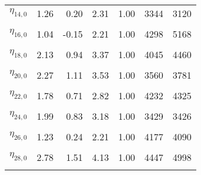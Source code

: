 \begin{table}
\begin{tabular}[t]{lrrrrrr}
$\eta_{14, 0}$ & 1.26 & 0.20 & 2.31 & 1.00 & 3344 & 3120\\
\cellcolor{gray!6}{$\eta_{15, 0}$} & \cellcolor{gray!6}{1.16} & \cellcolor{gray!6}{0.22} & \cellcolor{gray!6}{2.11} & \cellcolor{gray!6}{1.00} & \cellcolor{gray!6}{3137} & \cellcolor{gray!6}{1624}\\
$\eta_{16, 0}$ & 1.04 & -0.15 & 2.21 & 1.00 & 4298 & 5168\\
\cellcolor{gray!6}{$\eta_{17, 0}$} & \cellcolor{gray!6}{1.61} & \cellcolor{gray!6}{0.76} & \cellcolor{gray!6}{2.47} & \cellcolor{gray!6}{1.00} & \cellcolor{gray!6}{3896} & \cellcolor{gray!6}{3989}\\
$\eta_{18, 0}$ & 2.13 & 0.94 & 3.37 & 1.00 & 4045 & 4460\\
\cellcolor{gray!6}{$\eta_{19, 0}$} & \cellcolor{gray!6}{1.52} & \cellcolor{gray!6}{0.75} & \cellcolor{gray!6}{2.24} & \cellcolor{gray!6}{1.00} & \cellcolor{gray!6}{4252} & \cellcolor{gray!6}{4128}\\
$\eta_{20, 0}$ & 2.27 & 1.11 & 3.53 & 1.00 & 3560 & 3781\\
\cellcolor{gray!6}{$\eta_{21, 0}$} & \cellcolor{gray!6}{3.12} & \cellcolor{gray!6}{2.27} & \cellcolor{gray!6}{4.00} & \cellcolor{gray!6}{1.00} & \cellcolor{gray!6}{3923} & \cellcolor{gray!6}{3252}\\
$\eta_{22, 0}$ & 1.78 & 0.71 & 2.82 & 1.00 & 4232 & 4325\\
\cellcolor{gray!6}{$\eta_{23, 0}$} & \cellcolor{gray!6}{2.18} & \cellcolor{gray!6}{0.88} & \cellcolor{gray!6}{3.50} & \cellcolor{gray!6}{1.00} & \cellcolor{gray!6}{2298} & \cellcolor{gray!6}{1391}\\
$\eta_{24, 0}$ & 1.99 & 0.83 & 3.18 & 1.00 & 3429 & 3426\\
\cellcolor{gray!6}{$\eta_{25, 0}$} & \cellcolor{gray!6}{2.94} & \cellcolor{gray!6}{1.90} & \cellcolor{gray!6}{3.98} & \cellcolor{gray!6}{1.00} & \cellcolor{gray!6}{2949} & \cellcolor{gray!6}{2966}\\
$\eta_{26, 0}$ & 1.23 & 0.24 & 2.21 & 1.00 & 4177 & 4090\\
\cellcolor{gray!6}{$\eta_{27, 0}$} & \cellcolor{gray!6}{1.41} & \cellcolor{gray!6}{0.57} & \cellcolor{gray!6}{2.26} & \cellcolor{gray!6}{1.00} & \cellcolor{gray!6}{2381} & \cellcolor{gray!6}{1576}\\
$\eta_{28, 0}$ & 2.78 & 1.51 & 4.13 & 1.00 & 4447 & 4998\\
\cellcolor{gray!6}{$\eta_{29, 0}$} & \cellcolor{gray!6}{1.65} & \cellcolor{gray!6}{1.01} & \cellcolor{gray!6}{2.29} & \cellcolor{gray!6}{1.00} & \cellcolor{gray!6}{3449} & \cellcolor{gray!6}{5971}\\

\end{tabular}
\end{table}
